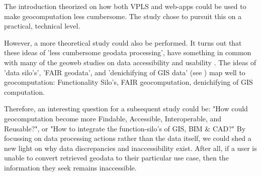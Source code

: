 The introduction theorized on how both VPLS and web-apps could be used to make geocomputation less cumbersome.
The study chose to pursuit this on a practical, technical level. 

However, a more theoretical study could also be performed. 
It turns out that these ideas of 'less cumbersome geodata processing', have something in common with many of the geoweb studies on data accessibility and usability \citep{brink_geospatial_2018}.
The ideas of 'data silo's', 'FAIR geodata', and 'denichifying of \ac{GIS} data' (see \citet{brink_geospatial_2018}) map well to geocomputation:
Functionality Silo's, FAIR geocomputation, denichifying of \ac{GIS} computation. 

Therefore, an interesting question for a subsequent study could be: "How could geocomputation become more Findable, Accessible, Interoperable, and Reusable?", or "How to integrate the function-silo's of GIS, BIM \& CAD?"
By focussing on data processing actions rather than the data itself, we could shed a new light on why data discrepancies and inaccessibility exist. 
After all, if a user is unable to convert retrieved geodata to their particular use case, then the information they seek remains inaccessible.







  


